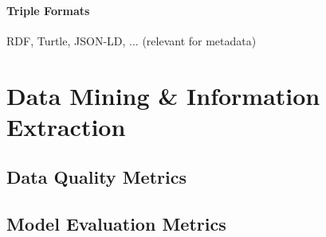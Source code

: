 \paragraph{Triple Formats}
RDF, Turtle, JSON-LD, ... (relevant for metadata)



\section{Data Mining \& Information Extraction}


\subsection{Data Quality Metrics}

\subsection{Model Evaluation Metrics}
